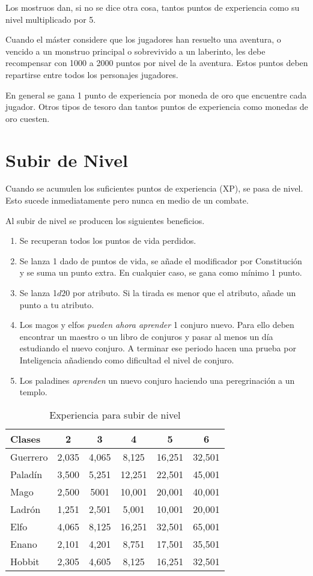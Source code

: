 \begin{multicols}{2}
Los mostruos dan, si no se dice otra cosa, tantos puntos de experiencia como su nivel
multiplicado por 5.

Cuando el máster considere que los jugadores han resuelto una aventura, o vencido
a un monstruo principal o sobrevivido a un laberinto, les debe recompensar con
1000 a 2000 puntos por nivel de la aventura. Estos puntos deben repartirse entre
todos los personajes jugadores.

En general se gana 1 punto de experiencia por moneda de oro que encuentre cada jugador.
Otros tipos de tesoro dan tantos puntos de experiencia como monedas de oro cuesten.

\section{Subir de Nivel}

Cuando se acumulen los suficientes puntos de experiencia (XP), se pasa de nivel. Esto
sucede inmediatamente pero nunca en medio de un combate.

Al subir de nivel se producen los siguientes beneficios.

\begin{enumerate}
\item Se recuperan todos los puntos de vida perdidos.
\item Se lanza 1 dado de puntos de vida, se añade el modificador por Constitución y se suma un punto extra. En cualquier caso, se gana como mínimo 1 punto.
\item Se lanza 1$  d20$ por atributo. Si la tirada es menor que el atributo, añade un punto a tu atributo.
\item Los magos y elfos \emph{pueden ahora aprender} 1 conjuro nuevo. Para ello deben encontrar un maestro o un libro de conjuros y pasar al menos un día estudiando el nuevo conjuro. A terminar ese periodo hacen una prueba por Inteligencia añadiendo como dificultad el nivel de conjuro.
\item Los paladines \emph{aprenden} un nuevo conjuro haciendo una peregrinación
a un templo.
\end{enumerate}

\begin{table*}[p]
\centering
\caption{Experiencia para subir de nivel}
\begin{tabular}{lccccc}
\toprule
Clases  & 2 & 3 & 4 & 5 & 6\\
\midrule
Guerrero & 2,035 & 4,065 & 8,125 & 16,251 & 32,501\\
Paladín & 3,500 & 5,251 & 12,251 & 22,501 & 45,001\\
Mago & 2,500 & 5001 & 10,001 & 20,001 & 40,001\\
Ladrón & 1,251 & 2,501 & 5,001 & 10,001 & 20,001\\
Elfo & 4,065 & 8,125 & 16,251 & 32,501 & 65,001\\
Enano & 2,101 & 4,201 & 8,751 & 17,501 & 35,501\\
Hobbit & 2,305 & 4,605 & 8,125 & 16,251 & 32,501\\
\bottomrule
\end{tabular}


\end{table*}
\end{multicols}
